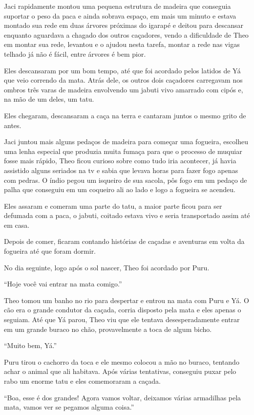 Jaci rapidamente montou uma pequena estrutura de madeira que conseguia
suportar o peso da paca e ainda sobrava espaço, em mais um minuto e
estava montado sua rede em duas árvores próximas do igarapé e deitou
para descansar enquanto aguardava a chagado dos outros caçadores, vendo
a dificuldade de Theo em montar sua rede, levantou e o ajudou nesta
tarefa, montar a rede nas vigas telhado já não é fácil, entre árvores é
bem pior.

Eles descansaram por um bom tempo, até que foi acordado pelos latidos de
Yá que veio correndo da mata. Atrás dele, os outros dois caçadores
carregavam nos ombros três varas de madeira envolvendo um jabuti vivo
amarrado com cipós e, na mão de um deles, um tatu.

Eles chegaram, descansaram a caça na terra e cantaram juntos o mesmo
grito de antes.

Jaci juntou mais alguns pedaços de madeira para começar uma fogueira,
escolheu uma lenha especial que produzia muita fumaça para que o
processo de muquiar fosse mais rápido, Theo ficou curioso sobre como
tudo iria acontecer, já havia assistido alguns seriados na tv e sabia
que levava horas para fazer fogo apenas com pedras. O índio pegou um
isqueiro de sua sacola, pôs fogo em um pedaço de palha que conseguiu em
um coqueiro ali ao lado e logo a fogueira se acendeu.

Eles assaram e comeram uma parte do tatu, a maior parte ficou para ser
defumada com a paca, o jabuti, coitado estava vivo e seria transportado
assim até em casa.

Depois de comer, ficaram contando histórias de caçadas e aventuras em
volta da fogueira até que foram dormir.

No dia seguinte, logo após o sol nascer, Theo foi acordado por Puru.

``Hoje você vai entrar na mata comigo.''

Theo tomou um banho no rio para despertar e entrou na mata com Puru e
Yá. O cão era o grande condutor da caçada, corria disposto pela mata e
eles apenas o seguiam. Até que Yá parou, Theo viu que ele tentava
desesperadamente entrar em um grande buraco no chão, provavelmente a
toca de algum bicho.

``Muito bem, Yá.''

Puru tirou o cachorro da toca e ele mesmo colocou a mão no buraco,
tentando achar o animal que ali habitava. Após várias tentativas,
conseguiu puxar pelo rabo um enorme tatu e eles comemoraram a caçada.

``Boa, esse é dos grandes! Agora vamos voltar, deixamos várias
armadilhas pela mata, vamos ver se pegamos alguma coisa.''


